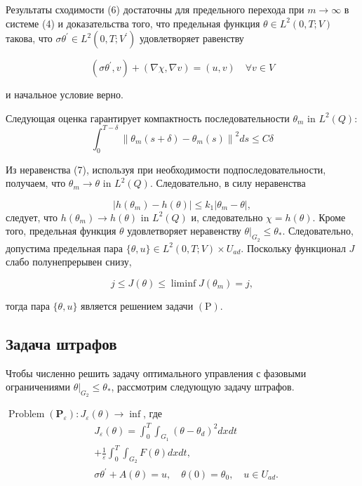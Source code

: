 Результаты сходимости (6) достаточны для предельного перехода
при $m \rightarrow \infty$ в системе (4) и доказательства того,
что предельная функция $\theta \in L^{2}(0, T ; V) $ такова,
что $\sigma \theta^{\prime} \in L^{2}\left(0, T ; V^{\prime}\right)$ удовлетворяет равенству

\[ \left(\sigma \theta^{\prime}, v\right)+(\nabla \chi, \nabla v)=(u, v) \quad \forall v \in V \]

и начальное условие верно.

Следующая оценка гарантирует компактность последовательности $\theta_{m}$ in $L^{2}(Q)$:
\[ \int_{0}^{T-\delta}\left\|\theta_{m}(s+\delta)-\theta_{m}(s)\right\|^{2} d s \leq C \delta \]

Из неравенства (7), используя при необходимости подпоследовательности, получаем, что
$\theta_{m} \rightarrow \theta$ in $L^{2}(Q)$.
Следовательно, в силу неравенства

\[ \left|h\left(\theta_{m}\right)-h(\theta)\right| \leq k_{1}\left|\theta_{m}-\theta\right|, \]
следует, что $h\left(\theta_{m}\right) \rightarrow h(\theta)$ in $L^{2}(Q)$
и, следовательно $\chi=h(\theta)$.
Кроме того, предельная функция $\theta$ удовлетворяет неравенству
$\left.\theta\right|_{G_{2}} \leq \theta_{*}$.
Следовательно, допустима предельная пара $\{\theta, u\} \in L^{2}(0, T ; V) \times U_{a d}$.
Поскольку функционал $J$ слабо полунепрерывен снизу,

\[ j \leq J(\theta) \leq \liminf J\left(\theta_{m}\right)=j, \]

тогда пара $\{\theta, u\}$ является решением задачи $(\mathrm{P})$.

\subsection{Задача штрафов}

Чтобы численно решить задачу оптимального управления с фазовыми ограничениями
$\left.\theta\right|_{G_{2}} \leq \theta_{*}$, рассмотрим следующую задачу штрафов.

$\operatorname{Problem}\left(\mathbf{P}_{\varepsilon}\right): J_{\varepsilon}(\theta) \rightarrow \inf$,
где
\[
    \begin{aligned}
        & J_{\varepsilon}(\theta)=\int_{0}^{T} \int_{G_{1}}\left(\theta-\theta_{d}\right)^{2} d x d t \\
        & +\frac{1}{\varepsilon} \int_{0}^{T} \int_{G_{2}} F(\theta) d x d t, \\
        & \sigma \theta^{\prime}+A(\theta)=u, \quad \theta(0)=\theta_{0}, \quad u \in U_{a d} .
    \end{aligned}
\]

